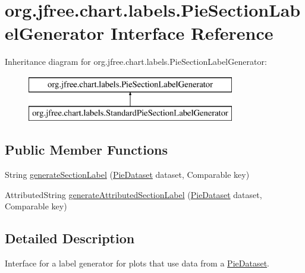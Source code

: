 \hypertarget{interfaceorg_1_1jfree_1_1chart_1_1labels_1_1_pie_section_label_generator}{}\section{org.\+jfree.\+chart.\+labels.\+Pie\+Section\+Label\+Generator Interface Reference}
\label{interfaceorg_1_1jfree_1_1chart_1_1labels_1_1_pie_section_label_generator}
Inheritance diagram for org.\+jfree.\+chart.\+labels.\+Pie\+Section\+Label\+Generator\+:\begin{figure}[H]
\begin{center}
\leavevmode
\includegraphics[height=2.000000cm]{interfaceorg_1_1jfree_1_1chart_1_1labels_1_1_pie_section_label_generator}
\end{center}
\end{figure}
\subsection*{Public Member Functions}
\begin{DoxyCompactItemize}
\item 
String \mbox{\hyperlink{interfaceorg_1_1jfree_1_1chart_1_1labels_1_1_pie_section_label_generator_a9c514ffcd269a3d73720c1ed588c624f}{generate\+Section\+Label}} (\mbox{\hyperlink{interfaceorg_1_1jfree_1_1data_1_1general_1_1_pie_dataset}{Pie\+Dataset}} dataset, Comparable key)
\item 
Attributed\+String \mbox{\hyperlink{interfaceorg_1_1jfree_1_1chart_1_1labels_1_1_pie_section_label_generator_a3e031cb96d404cbc1736723269ca8a80}{generate\+Attributed\+Section\+Label}} (\mbox{\hyperlink{interfaceorg_1_1jfree_1_1data_1_1general_1_1_pie_dataset}{Pie\+Dataset}} dataset, Comparable key)
\end{DoxyCompactItemize}


\subsection{Detailed Description}
Interface for a label generator for plots that use data from a \mbox{\hyperlink{}{Pie\+Dataset}}. 

